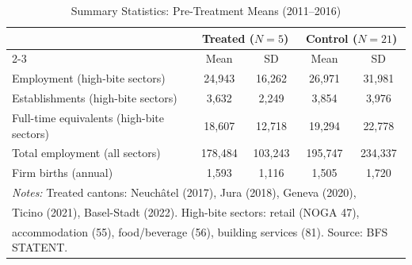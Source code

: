 \begin{table}[htbp]
\centering
\caption{Summary Statistics: Pre-Treatment Means (2011--2016)}
\label{tab:summ}
\begin{tabular}{lcccc}
\hline\hline
 & \multicolumn{2}{c}{Treated ($N=5$)} & \multicolumn{2}{c}{Control ($N=21$)} \\
\cline{2-3} \cline{4-5}
 & Mean & SD & Mean & SD \\
\hline
Employment (high-bite sectors) & 24,943 & 16,262 & 26,971 & 31,981 \\
Establishments (high-bite sectors) & 3,632 & 2,249 & 3,854 & 3,976 \\
Full-time equivalents (high-bite sectors) & 18,607 & 12,718 & 19,294 & 22,778 \\
Total employment (all sectors) & 178,484 & 103,243 & 195,747 & 234,337 \\
Firm births (annual) & 1,593 & 1,116 & 1,505 & 1,720 \\
\hline
\multicolumn{5}{l}{\footnotesize \textit{Notes:} Treated cantons: Neuch\^{a}tel (2017), Jura (2018), Geneva (2020),} \\
\multicolumn{5}{l}{\footnotesize Ticino (2021), Basel-Stadt (2022). High-bite sectors: retail (NOGA 47),} \\
\multicolumn{5}{l}{\footnotesize accommodation (55), food/beverage (56), building services (81). Source: BFS STATENT.} \\
\end{tabular}
\end{table}

